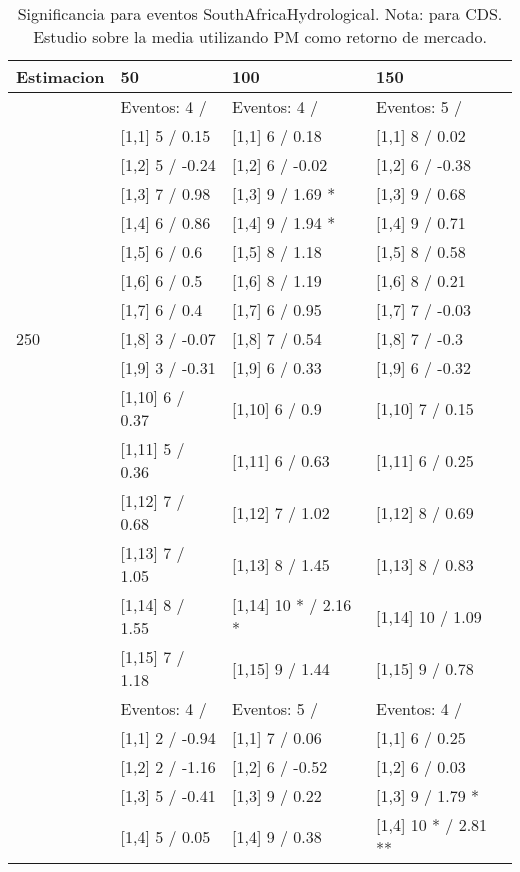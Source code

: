 \begin{table}

\caption{Significancia para eventos SouthAfricaHydrological. Nota: para CDS. Estudio sobre la media utilizando PM como retorno de mercado.}
\centering
\begin{tabular}[t]{llll}
\toprule
Estimacion & 50 & 100 & 150\\
\midrule
 & Eventos:  4 / & Eventos:  4 / & Eventos:  5 /\\
 & {}[1,1] 5  / 0.15 & {}[1,1] 6  / 0.18 & {}[1,1] 8  / 0.02\\
 & {}[1,2] 5  / -0.24 & {}[1,2] 6  / -0.02 & {}[1,2] 6  / -0.38\\
 & {}[1,3] 7  / 0.98 & {}[1,3] 9  / 1.69 * & {}[1,3] 9  / 0.68\\
 & {}[1,4] 6  / 0.86 & {}[1,4] 9  / 1.94 * & {}[1,4] 9  / 0.71\\
\addlinespace
 & {}[1,5] 6  / 0.6 & {}[1,5] 8  / 1.18 & {}[1,5] 8  / 0.58\\
 & {}[1,6] 6  / 0.5 & {}[1,6] 8  / 1.19 & {}[1,6] 8  / 0.21\\
 & {}[1,7] 6  / 0.4 & {}[1,7] 6  / 0.95 & {}[1,7] 7  / -0.03\\
250 & {}[1,8] 3  / -0.07 & {}[1,8] 7  / 0.54 & {}[1,8] 7  / -0.3\\
 & {}[1,9] 3  / -0.31 & {}[1,9] 6  / 0.33 & {}[1,9] 6  / -0.32\\
\addlinespace
 & {}[1,10] 6  / 0.37 & {}[1,10] 6  / 0.9 & {}[1,10] 7  / 0.15\\
 & {}[1,11] 5  / 0.36 & {}[1,11] 6  / 0.63 & {}[1,11] 6  / 0.25\\
 & {}[1,12] 7  / 0.68 & {}[1,12] 7  / 1.02 & {}[1,12] 8  / 0.69\\
 & {}[1,13] 7  / 1.05 & {}[1,13] 8  / 1.45 & {}[1,13] 8  / 0.83\\
 & {}[1,14] 8  / 1.55 & {}[1,14] 10 * / 2.16 * & {}[1,14] 10  / 1.09\\
\addlinespace
 & {}[1,15] 7  / 1.18 & {}[1,15] 9  / 1.44 & {}[1,15] 9  / 0.78\\
 & Eventos:  4 / & Eventos:  5 / & Eventos:  4 /\\
 & {}[1,1] 2  / -0.94 & {}[1,1] 7  / 0.06 & {}[1,1] 6  / 0.25\\
 & {}[1,2] 2  / -1.16 & {}[1,2] 6  / -0.52 & {}[1,2] 6  / 0.03\\
 & {}[1,3] 5  / -0.41 & {}[1,3] 9  / 0.22 & {}[1,3] 9  / 1.79 *\\
\addlinespace
 & {}[1,4] 5  / 0.05 & {}[1,4] 9  / 0.38 & {}[1,4] 10 * / 2.81 **\\

\end{tabular}
\end{table}

